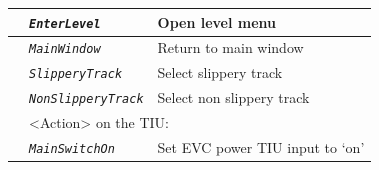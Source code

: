 \begin{itemize}
\begin{longtable}{|l|l|l|}
			\hline

			&	\begin{minipage}[t]{0.30\linewidth} \emph{\texttt{EnterLevel}} \end{minipage}
			&	\begin{minipage}[t]{0.38\linewidth} Open level menu \end{minipage} \\

			\hline

			&	\begin{minipage}[t]{0.30\linewidth} \emph{\texttt{MainWindow}} \end{minipage}
			&	\begin{minipage}[t]{0.38\linewidth} Return to main window \end{minipage} \\

			\hline

			&	\begin{minipage}[t]{0.30\linewidth} \emph{\texttt{SlipperyTrack}} \end{minipage}
			&	\begin{minipage}[t]{0.38\linewidth} Select slippery track \end{minipage} \\

			\hline

			&	\begin{minipage}[t]{0.30\linewidth} \emph{\texttt{NonSlipperyTrack}} \end{minipage}
			&	\begin{minipage}[t]{0.38\linewidth} Select non slippery track \end{minipage} \\

			\hline

			&	\multicolumn{2}{l|}{ \begin{minipage}[t]{0.78\linewidth} <Action> on the TIU: \end{minipage} } \\

			\hline

			&	\begin{minipage}[t]{0.30\linewidth} \emph{\texttt{MainSwitchOn}} \end{minipage}
			&	\begin{minipage}[t]{0.38\linewidth} Set EVC power TIU input to ‘on’ \end{minipage} \\


\end{longtable}
\end{itemize}
